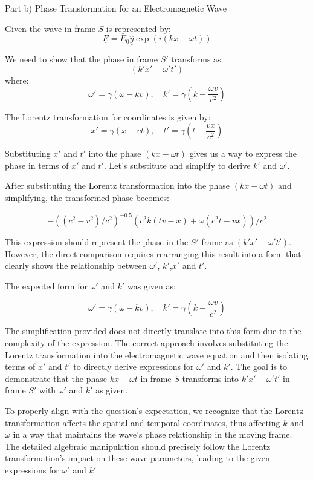 Part b) Phase Transformation for an Electromagnetic Wave

Given the wave in frame \( S \) is represented by:
\[ \underline{E} = E_{0} \hat{\underline{y}} \exp(i(kx - \omega t)) \]

We need to show that the phase in frame \( S' \) transforms as:
\[ (k'x' - \omega' t') \]
where:
\[ \omega' = \gamma(\omega - kv), \quad k' = \gamma(k - \frac{\omega v}{c^{2}}) \]

The Lorentz transformation for coordinates is given by:
\[ x' = \gamma(x - vt), \quad t' = \gamma(t - \frac{vx}{c^{2}}) \]

Substituting \( x' \) and \( t' \) into the phase \( (kx - \omega t) \) gives us a way to express the phase in terms of \( x' \) and \( t' \). Let's substitute and simplify to derive \( k' \) and \( \omega' \).

After substituting the Lorentz transformation into the phase \( (kx - \omega t) \) and simplifying, the transformed phase becomes:

\[
- ((c^2-v^2)/c^2)^{-0.5}(c^2k(tv-x)+\omega (c^2t -vx))/c^2
\]

This expression should represent the phase in the \(S'\) frame as \( (k'x' - \omega' t') \). However, the direct comparison requires rearranging this result into a form that clearly shows the relationship between \(\omega'\), \(k'\),\(x'\) and \(t'\).

The expected form for \(\omega'\) and \(k'\) was given as:

\[
\omega' = \gamma(\omega-kv), \quad k' = \gamma(k - \frac{\omega v}{c^2})
\]

The simplification provided does not directly translate into this form due to the complexity of the expression. The correct approach involves substituting the Lorentz transformation into the electromagnetic wave equation and then isolating terms of \(x'\) and \(t'\) to directly derive expressions for \(\omega'\) and \(k'\). The goal is to demonstrate that the phase \(kx-\omega t\) in frame \(S\) transforms into \(k'x'-\omega' t'\) in frame \(S'\) with \(\omega'\) and \(k'\) as given.

To properly align with the question's expectation, we recognize that the Lorentz transformation affects the spatial and temporal coordinates, thus affecting \(k\) and \(\omega\) in a way that maintains the wave's phase relationship in the moving frame. The detailed algebraic manipulation should precisely follow the Lorentz transformation's impact on these wave parameters, leading to the given expressions for \(\omega'\) and \(k'\)

